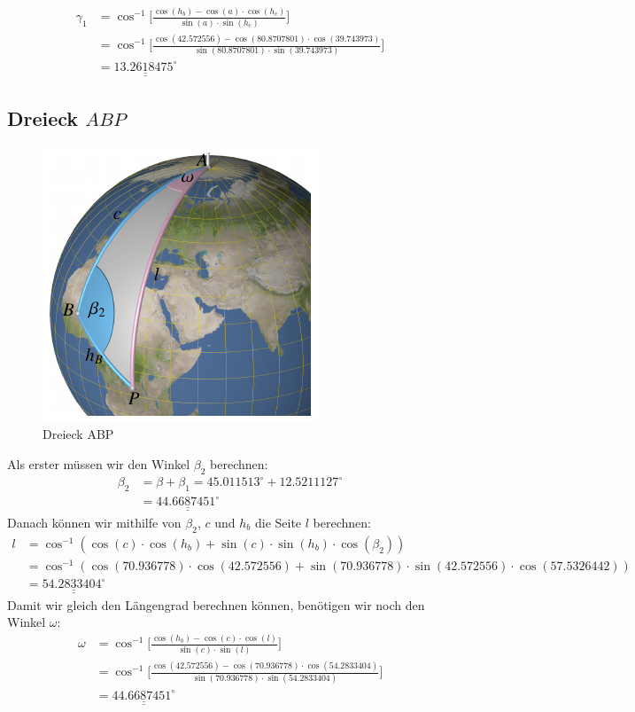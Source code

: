 \begin{align}
	\gamma_1 &= \cos^{-1}  \bigg[\frac{\cos(h_b)-\cos(a) \cdot \cos(h_c)}{\sin(a) \cdot \sin(h_c)}\bigg] \nonumber \\
	&= \cos^{-1}  \bigg[\frac{\cos(42.572556)-\cos(80.8707801) \cdot \cos(39.743973)}{\sin(80.8707801) \cdot \sin(39.743973)}\bigg] \nonumber \\
	&=\underline{\underline{13.2618475^\circ}} \nonumber
\end{align}

\subsection{Dreieck $ABP$}
\begin{figure}
	\includegraphics{papers/nav/bilder/position4.pdf}
	\caption{Dreieck ABP}
\end{figure}
Als erster müssen wir den Winkel $\beta_2$ berechnen:
\begin{align}
	\beta_2 &= \beta + \beta_1 = 45.011513^\circ + 12.5211127^\circ \nonumber \\
	&=\underline{\underline{44.6687451^\circ}} \nonumber
\end{align}
Danach können wir mithilfe von $\beta_2$, $c$ und $h_b$ die Seite $l$ berechnen:
\begin{align}
	l &= \cos^{-1}(\cos(c) \cdot \cos(h_b) + \sin(c) \cdot \sin(h_b) \cdot \cos(\beta_2)) \nonumber \\
	&= \cos^{-1}(\cos(70.936778) \cdot \cos(42.572556) + \sin(70.936778) \cdot \sin(42.572556) \cdot \cos(57.5326442)) \nonumber \\
	&= \underline{\underline{54.2833404^\circ}} \nonumber
\end{align}
Damit wir gleich den Längengrad berechnen können, benötigen wir noch den Winkel $\omega$:
\begin{align}
	\omega &= \cos^{-1}  \bigg[\frac{\cos(h_b)-\cos(c) \cdot \cos(l)}{\sin(c) \cdot \sin(l)}\bigg] \nonumber \\
	&=\cos^{-1}  \bigg[\frac{\cos(42.572556)-\cos(70.936778) \cdot \cos(54.2833404)}{\sin(70.936778) \cdot \sin(54.2833404)}\bigg] \nonumber \\
	&= \underline{\underline{44.6687451^\circ}} \nonumber
\end{align}

